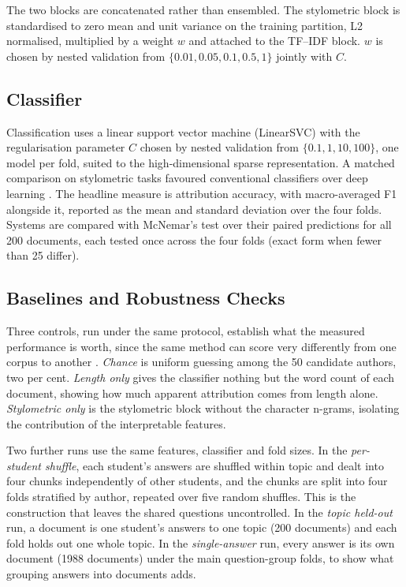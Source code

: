 \documentclass[conference]{IEEEtran}
\begin{document}
The two blocks are concatenated rather than ensembled. The stylometric block is standardised to zero mean and unit variance on the training partition, L2 normalised, multiplied by a weight $w$ and attached to the TF--IDF block. $w$ is chosen by nested validation from $\{0.01, 0.05, 0.1, 0.5, 1\}$ jointly with $C$.

\subsection{Classifier}

Classification uses a linear support vector machine (LinearSVC) with the regularisation parameter $C$ chosen by nested validation from $\{0.1, 1, 10, 100\}$, one model per fold, suited to the high-dimensional sparse representation. A matched comparison on stylometric tasks favoured conventional classifiers over deep learning \cite{Sayoud2025}. The headline measure is attribution accuracy, with macro-averaged F1 alongside it, reported as the mean and standard deviation over the four folds. Systems are compared with McNemar's test over their paired predictions for all 200 documents, each tested once across the four folds (exact form when fewer than 25 differ).

\subsection{Baselines and Robustness Checks}

Three controls, run under the same protocol, establish what the measured performance is worth, since the same method can score very differently from one corpus to another \cite{Murauer2021}. \textit{Chance} is uniform guessing among the 50 candidate authors, two per cent. \textit{Length only} gives the classifier nothing but the word count of each document, showing how much apparent attribution comes from length alone. \textit{Stylometric only} is the stylometric block without the character n-grams, isolating the contribution of the interpretable features.

Two further runs use the same features, classifier and fold sizes. In the \textit{per-student shuffle}, each student's answers are shuffled within topic and dealt into four chunks independently of other students, and the chunks are split into four folds stratified by author, repeated over five random shuffles. This is the construction that leaves the shared questions uncontrolled. In the \textit{topic held-out} run, a document is one student's answers to one topic (200 documents) and each fold holds out one whole topic. In the \textit{single-answer} run, every answer is its own document (1988 documents) under the main question-group folds, to show what grouping answers into documents adds.
\end{document}
